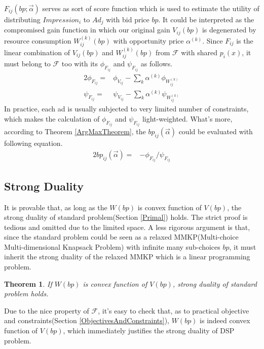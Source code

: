 \documentclass{article}
\newtheorem{theorem}{Theorem}[section]
\newcommand{\sbp}{bp_{ij}}
\newcommand{\sV}{V_{ij}}
\newcommand{\sW}{W_{ij}^{(k)}}
\newcommand{\salpha}{\alpha^{(k)}}
\newcommand{\sF}{F_{ij}}
\newcommand{\valpha}{\vec{\alpha}}
\newcommand{\pprob}{\phi}
\newcommand{\pcost}{\psi}
\newcommand{\uff}{\mathscr{F}}
\begin{document}
$\sF(bp; \valpha)$ serves as sort of score function which is used to estimate
    the utility of distributing $Impression_i$ to $Ad_j$ with bid price $bp$.
It could be interpreted as the compromised gain function in which
    our original gain $\sV(bp)$ is degenerated by resource consumption $\sW(bp)$ with opportunity price $\salpha$.
Since $\sF$ is the linear combination of $\sV(bp)$ and $\sW(bp)$ from $\uff$ with shared $p_i(x)$,
    it must belong to $\uff$ too with its $\pprob_{\sF}$ and $\pcost_{\sF}$ as follows.
\begin{alignat}{2}
\pprob_{\sF}= & \pprob_{\sV} - \sum\limits_k \salpha \pprob_{\sW} \\
\pcost_{\sF}= & \pcost_{\sV} - \sum\limits_k \salpha \pcost_{\sW}
\end{alignat}
In practice, each ad is usually subjected to very limited number of constraints,
    which makes the calculation of $\pprob_{\sF}$ and $\pcost_{\sF}$ light-weighted.
What's more, according to Theorem \ref{ArgMaxTheorem}, the $\sbp(\valpha)$ could be evaluated with following equation.
\begin{alignat}{2}
\sbp(\valpha)= & - \pprob_{\sF} / \pcost_{\sF}
\end{alignat}

\subsection{Strong Duality}

It is provable that, as long as the $W(bp)$ is convex function of $V(bp)$,
    the strong duality of standard problem(Section \ref{Primal}) holds.
The strict proof is tedious and omitted due to the limited space.
A less rigorous argument is that, since the standard problem could be seen as
    a relaxed MMKP(Multi-choice Multi-dimensional Knapsack Problem) with infinite many sub-choices $bp$,
    it must inherit the strong duality of the relaxed MMKP which is a linear programming problem.

\begin{theorem} \label{StrongDualityTheorem}
If $W(bp)$ is convex function of $V(bp)$, strong duality of standard problem holds.
\end{theorem}

Due to the nice property of $\uff$, it's easy to check that,
    as to practical objective and constraints(Section \ref{ObjectivesAndConstraints}),
    $W(bp)$ is indeed convex function of $V(bp)$,
    which immediately justifies the strong duality of DSP problem.
\end{document}
